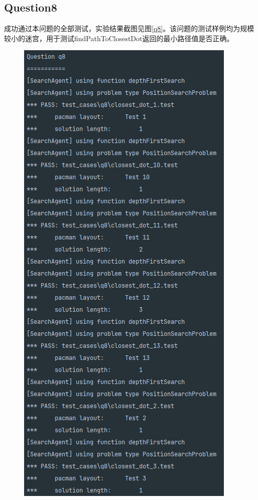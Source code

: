 \subsection{Question8}
成功通过本问题的全部测试，实验结果截图见图\ref{q8}。该问题的测试样例均为规模较小的迷宫，用于测试findPathToClosestDot返回的最小路径值是否正确。
\begin{figure}[!htbp]
    \centering
    \begin{minipage}[t]{0.4\textwidth}
    \centering
    \includegraphics[width=\textwidth]{pic/q81.png}

\end{minipage}
\end{figure}
